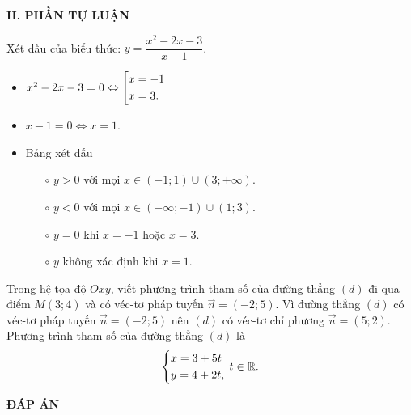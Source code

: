 \noindent\textbf{II. PHẦN TỰ LUẬN}
\begin{bt}%
 Xét dấu của biểu thức: $y = \dfrac{x^2 - 2x - 3}{x-1}$.
 \loigiai
 {
 \begin{itemize}
  \item $x^2 - 2x - 3 = 0 \Leftrightarrow \left[\begin{aligned}& x = -1 \\& x = 3.\end{aligned}\right.$
  \item $x - 1 = 0 \Leftrightarrow x = 1$.
  \item Bảng xét dấu
   \begin{center}
   \end{center}
   \begin{itemize}
   	\item[$\circ$] $y > 0$ với mọi $x \in (-1;1) \cup (3; +\infty)$.
   	\item[$\circ$] $y < 0$ với mọi $x \in (-\infty;-1) \cup (1; 3)$.
   	\item[$\circ$] $y = 0$ khi $x = - 1$ hoặc $x = 3$.
   	\item[$\circ$] $y$ không xác định khi $x = 1$.
   \end{itemize}
 \end{itemize}
 }
\end{bt}


\begin{bt}%
 Trong hệ tọa độ $Oxy$, viết phương trình tham số của đường thẳng $(d)$ đi qua điểm $M(3;4)$ và có véc-tơ pháp tuyến $\vec{n} = (-2;5)$.
 \loigiai
 {
 Vì đường thẳng $(d)$ có véc-tơ pháp tuyến $\vec{n} = (-2;5)$ nên $(d)$ có véc-tơ chỉ phương $\vec{u} = (5;2)$.\\
 Phương trình tham số của đường thẳng $(d)$ là
 $$\left\{\begin{aligned}& x = 3 + 5t \\& y = 4 + 2t,\end{aligned}\right. \, t \in \mathbb{R}.$$
 }
\end{bt}




\newpage
\begin{center}
	\textbf{ĐÁP ÁN}
\end{center}
\begin{multicols}{10}
	 
\end{multicols}
